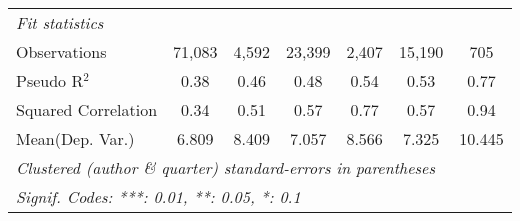 \begin{tabular}{lcccccc}
   \midrule
   \emph{Fit statistics}\\
   Observations                                               & 71,083      & 4,592        & 23,399  & 2,407          & 15,190       & 705\\  
   Pseudo R$^2$                                               & 0.38        & 0.46         & 0.48    & 0.54           & 0.53         & 0.77\\  
   Squared Correlation                                        & 0.34        & 0.51         & 0.57    & 0.77           & 0.57         & 0.94\\  
Mean(Dep. Var.) & 6.809 & 8.409 & 7.057 & 8.566 & 7.325 & 10.445 \\
   \midrule \midrule
   \multicolumn{7}{l}{\emph{Clustered (author \& quarter) standard-errors in parentheses}}\\
   \multicolumn{7}{l}{\emph{Signif. Codes: ***: 0.01, **: 0.05, *: 0.1}}\\
\end{tabular}
\par\endgroup
